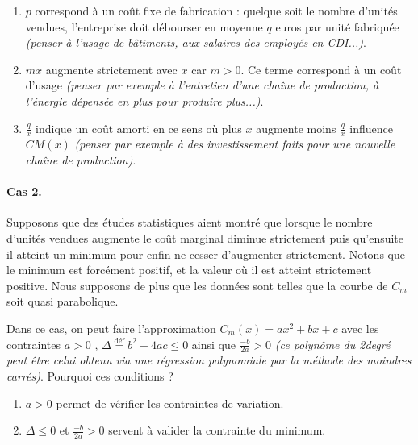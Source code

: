\begin{enumerate}
	\item $p$ correspond à un coût fixe de fabrication : quelque soit le nombre d'unités vendues, l'entreprise doit débourser en moyenne $q$ euros par unité fabriquée 
	\emph{(penser à l'usage de bâtiments, aux salaires des employés en CDI...)}.


	\item $mx$ augmente strictement avec $x$ car $m > 0$. Ce terme correspond à un coût d'usage
	\emph{(penser par exemple à l'entretien d'une chaîne de production, à l'énergie dépensée en plus pour produire plus...)}.


	\item $\frac{q}{x}$ indique un coût amorti en ce sens où plus $x$ augmente moins $\frac{q}{x}$ influence $CM(x)$
	\emph{(penser par exemple à des investissement faits pour une nouvelle chaîne de production)}.
\end{enumerate}




\paragraph{Cas 2.}

Supposons que des études statistiques aient montré que lorsque le nombre d'unités vendues augmente le coût marginal diminue strictement puis qu'ensuite il atteint un minimum pour enfin ne cesser d'augmenter strictement.
Notons que le minimum est forcément positif, et la valeur où il est atteint strictement positive.
Nous supposons de plus que les données sont telles que la courbe de $C_m$ soit quasi parabolique.


\medskip


Dans ce cas, on peut faire l'approximation $C_m(x) = ax^2 + bx + c$ avec les contraintes $a > 0$ , $\Delta \stackrel{\text{déf}}{=} b^2 - 4ac \leq 0$ ainsi que $\frac{-b}{2a} > 0$ \emph{(ce polynôme du 2\ieme degré peut être celui obtenu via une régression polynomiale par la méthode des moindres carrés)}. Pourquoi ces conditions ?

\begin{enumerate}
	\item $a > 0$ permet de vérifier les contraintes de variation.


	\item $\Delta \leq 0$ et $\frac{-b}{2a} > 0$ servent à valider la contrainte du minimum.
\end{enumerate}


